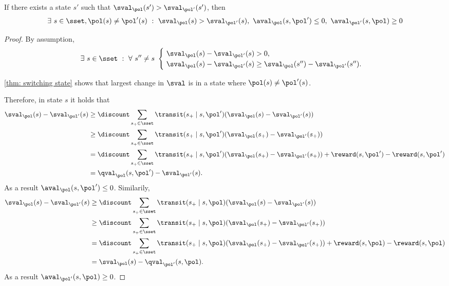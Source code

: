\begin{lemma}
\label{thm: state when don't want to switch}
    If there exists a state $s'$ such that $\sval_{\pol}(s') > \sval_{\pol'}(s')$,
    then
    \begin{align}
        \exists \ s \in \sset,
        \pol(s) \neq \pol'(s)
        \ : \
        \sval_{\pol}(s) > \sval_{\pol'}(s), \
        \aval_\pol(s, \pol') \leq 0, \
        \aval_{\pol'}(s, \pol) \geq 0
    \end{align}
\end{lemma}
\begin{proof}
    By assumption,
    \begin{align}
        \exists \ s \in \sset 
        \ : \ 
        \forall \ s'' \neq s \
        \begin{cases}
        \ \sval_{\pol}(s) - \sval_{\pol'}(s) > 0 ,
        \\
        \ \sval_{\pol}(s) - \sval_{\pol'}(s) \geq \sval_{\pol}(s'') - \sval_{\pol'}(s'') .
        \end{cases}
    \end{align}

    \autoref{thm: switching state} shows that largest change in $\sval$ is in a state where $\pol(s) \neq \pol'(s)$.
    
    Therefore, 
    in state $s$ it holds that
    \begin{align*}
        \sval_{\pol}(s) - \sval_{\pol'}(s) 
        &\geq \discount \sum_{s_+ \in \sset} \transit(s_+ \mid s, \pol') (\sval_{\pol}(s) - \sval_{\pol'}(s))
        \\
        &\geq \discount \sum_{s_+ \in \sset} \transit(s_+ \mid s, \pol') (\sval_{\pol}(s_+) - \sval_{\pol'}(s_+))
        \\
        &= \discount \sum_{s_+ \in \sset} \transit(s_+ \mid s, \pol') (\sval_{\pol}(s_+) - \sval_{\pol'}(s_+)) + \reward(s, \pol') - \reward(s, \pol')
        \\
        &= \qval_\pol(s, \pol') - \sval_{\pol'}(s) .
    \end{align*}
    As a result $\aval_\pol(s, \pol') \leq 0$. Similarily,
    \begin{align*}
        \sval_{\pol}(s) - \sval_{\pol'}(s) 
        &\geq \discount \sum_{s_+ \in \sset} \transit(s_+ \mid s, \pol) (\sval_{\pol}(s) - \sval_{\pol'}(s))
        \\
        &\geq \discount \sum_{s_+ \in \sset} \transit(s_+ \mid s, \pol) (\sval_{\pol}(s_+) - \sval_{\pol'}(s_+))
        \\
        &= \discount \sum_{s_+ \in \sset} \transit(s_+ \mid s, \pol) (\sval_{\pol}(s_+) - \sval_{\pol'}(s_+)) + \reward(s, \pol) - \reward(s, \pol)
        \\
        &= \sval_{\pol}(s) - \qval_{\pol'}(s, \pol) .
    \end{align*}
    As a result $\aval_{\pol'}(s, \pol) \geq 0$.


\end{proof}
